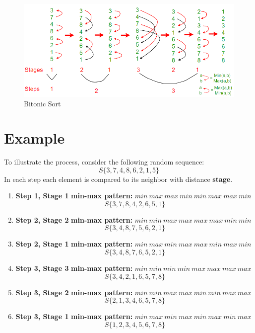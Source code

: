 \documentclass[12pt]{report}
\begin{document}
    \begin{figure}
        \centering
        \includegraphics[width=0.9\linewidth]{bitonic.png}
        \caption{Bitonic Sort}
        \label{fig:enter-label}
    \end{figure}
    \section{Example}

    To illustrate the process, consider the following random sequence:
    \[S\{ 3,7,4,8,6,2,1,5 \}\]
    In each step each element is compared to its neighbor with distance \textbf{stage}.

    \begin{enumerate}
        \item \textbf{Step 1, Stage 1}
        \textbf{min-max pattern:} $min\:max\:max\:min\:min\:max\:max\:min$
        \[
            S\{3,7,8,4,2,6,5,1\}
        \] 
        \item \textbf{Step 2, Stage 2}
        \textbf{min-max pattern:} $min\:min\:max\:max\:max\:max\:min\:min$
        \[
            S\{3,4,8,7,5,6,2,1\}
        \]
        \item \textbf{Step 2, Stage 1}
        \textbf{min-max pattern:} $min\:max\:min\:max\:max\:min\:max\:min$
        \[
            S\{3,4,8,7,6,5,2,1\}
        \]
        \item \textbf{Step 3, Stage 3}
        \textbf{min-max pattern:} $min\:min\:min\:min\:max\:max\:max\:max$
        \[
            S\{3,4,2,1,6,5,7,8\}
        \]
        \item \textbf{Step 3, Stage 2}
        \textbf{min-max pattern:} $min\:min\:max\:max\:min\:min\:max\:max$
        \[
            S\{2,1,3,4,6,5,7,8\}
        \]
        \item \textbf{Step 3, Stage 1}
        \textbf{min-max pattern:} $min\:max\:min\:max\:min\:max\:min\:max$
        \[
            S\{1, 2, 3, 4, 5, 6, 7, 8\}
        \]
    \end{enumerate}
\end{document}
